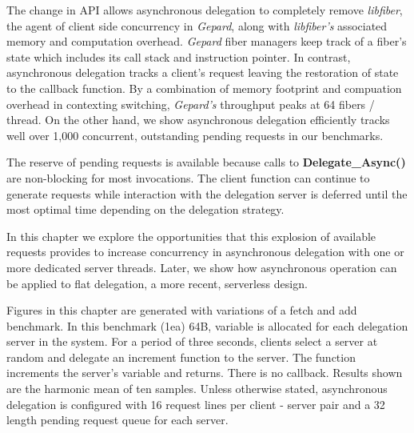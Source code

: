 \documentclass{uicthesi}
\begin{document}
The change in API allows asynchronous delegation to completely remove \textit{libfiber}, the agent of client side concurrency in \textit{Gepard}, along with \textit{libfiber's} associated memory and computation overhead. \textit{Gepard} fiber managers keep track of a fiber's state which includes its call stack and instruction pointer. In contrast, asynchronous delegation tracks a client's request leaving the restoration of state to the callback function. By a combination of memory footprint and compuation overhead in contexting switching, \textit{Gepard's} throughput peaks at 64 fibers / thread. On the other hand, we show asynchronous delegation efficiently tracks well over 1,000 concurrent, outstanding pending requests in our benchmarks. 

The reserve of pending requests is available because calls to \textbf{Delegate\_Async()} are non-blocking for most invocations. The client function can continue to generate requests while interaction with the delegation server is deferred until the most optimal time depending on the delegation strategy. 

In this chapter we explore the opportunities that this explosion of available requests provides to increase concurrency in asynchronous delegation with one or more dedicated server threads. Later, we show how asynchronous operation can be applied to flat delegation, a more recent, serverless design. 

Figures in this chapter are generated with variations of a fetch and add benchmark. In this benchmark (1ea) 64B, variable is allocated for each delegation server in the system. For a period of three seconds, clients select a server at random and delegate an increment function to the server. The function increments the server's variable and returns. There is no callback. Results shown are the harmonic mean of ten samples. Unless otherwise stated, asynchronous delegation is configured with 16 request lines per client - server pair and a 32 length pending request queue for each server.  
\end{document}
